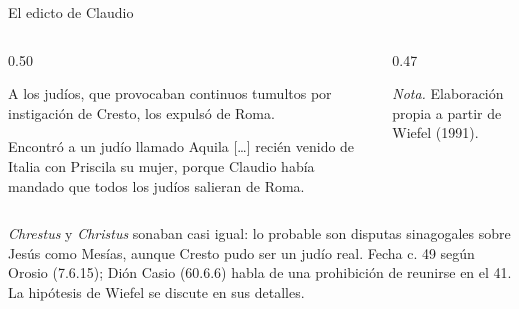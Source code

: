 \begin{frame}{El edicto de Claudio}
\begin{columns}[T,onlytextwidth]
\begin{column}{0.50\textwidth}
\begin{cita}A los judíos, que provocaban continuos tumultos por instigación de Cresto, los expulsó de Roma.\end{cita}
\begin{cita}Encontró a un judío llamado Aquila [\ldots] recién venido de Italia con Priscila su mujer, porque Claudio había mandado que todos los judíos salieran de Roma.\end{cita}
\end{column}
\begin{column}{0.47\textwidth}
\centering
{}\par
{\fontsize{5}{6}\selectfont\color{sepia}\hfill\textit{Nota.} Elaboración propia a partir de Wiefel (1991).\par}
\end{column}
\end{columns}
\begin{notalam}
\emph{Chrestus} y \emph{Christus} sonaban casi igual: lo probable son disputas sinagogales sobre Jesús como Mesías, aunque Cresto pudo ser un judío real. Fecha c. 49 según Orosio (7.6.15); Dión Casio (60.6.6) habla de una prohibición de reunirse en el 41. La hipótesis de Wiefel se discute en sus detalles.
\end{notalam}
\end{frame}


